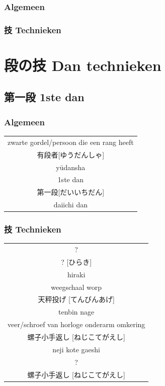\documentclass[a4paper, 12pt]{article}
\begin{document}
\begin{CJK}{UTF8}{min}
\subsubsection{Algemeen}
\subsubsection{技 Technieken}

\newpage
\section{段の技 Dan technieken}
\subsection{第一段 1ste dan}
\subsubsection{Algemeen}
\begin{table}[H]
\begin{center}
\begin{tabular}{c}
zwarte gordel/persoon die een rang heeft\\
有段者[ゆうだんしゃ]\\
y\={u}dansha\\
\hline
1ste dan\\
第一段[だいいちだん]\\
daiichi dan
\end{tabular}
\end{center}
\label{dan_1_gen}
\end{table}

\subsubsection{技 Technieken}
\begin{table}[H]
\begin{center}
\begin{tabular}{c}
?\\
? [ひらき]\\
hiraki\\
\hline
weegschaal worp\\
天秤投げ [てんびんあげ]\\
tenbin nage\\
\hline
veer/schroef van horloge onderarm omkering\\
螺子小手返し [ねじこてがえし]\\
neji kote gaeshi\\
\hline
?\\
螺子小手返し [ねじこてがえし]\\
\end{tabular}
\end{center}
\label{dan_1}
\end{table}


\end{CJK}
\end{document}
